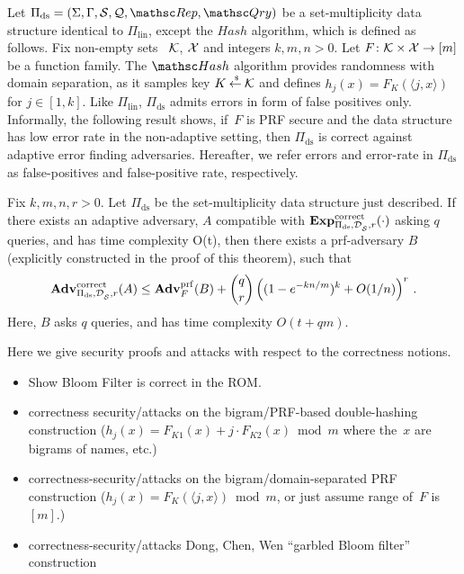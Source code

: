 Let $\Pi_{\mathrm{ds}}= (\Sigma,\Gamma,\calS,\calQ,\Rep, \Qry)$ be a set-multiplicity data structure identical to $\Pi_{\mathrm{lin}}$, except the $Hash$ algorithm, which is defined as follows. Fix non-empty sets ~${\cal K}$, ${\cal X}$ and integers $k,m,n>0$.  Let $F\colon\mathcal{K} \times {\cal X} \to [m]$ be a function family.  The $\Hash$ algorithm provides randomness with domain separation, as it samples key $K {\:\stackrel{{\scriptscriptstyle \hspace{0.2em}\$}} {\leftarrow}\:} \mathcal{K}$ and defines $h_j(x) = F_K(\langle j,x \rangle) $ for $j \in [1,k]$. Like $\Pi_{\mathrm{lin}}$, $\Pi_{\mathrm{ds}}$ admits errors in form of false positives only. Informally, the following result shows, if~$F$ is PRF secure and the data structure has low error rate in the non-adaptive setting, then $\Pi_{\mathrm{ds}}$ is correct against adaptive error finding adversaries. Hereafter, we refer errors and error-rate in $\Pi_{\mathrm{ds}}$ as false-positives and false-positive rate, respectively.

\begin{theorem}\label{thm2}
Fix $k,m,n,r >0$. Let $\Pi_{\mathrm{ds}}$ be the set-multiplicity data structure just described. If there exists an adaptive adversary, $A$ compatible with $\mathrm{\mathbf{Exp}}^{\mathrm{correct}}_{\Pi_{\mathrm{ds}},\mathcal{D}_{{\cal S}}^{},r}(\cdot)$ asking $q$ queries, and has time complexity O(t), then there exists a prf-adversary $B$ (explicitly constructed in the proof of this theorem), such that
\[
\mathrm{\mathbf{Adv}}^{\mathrm{correct}}_{\Pi_{\mathrm{ds}},\mathcal{D}_{{\cal S}}^{},r}(A) \leq  \mathbf{Adv}^{\mathrm{prf}}_{F}(B)  + {\dbinom{q}{r}} \left( (1-e^{-kn/m})^k + O(1/n) \right)^r\,.
\]
Here, $B$ asks $q$ queries, and has time complexity $O(t+qm)$.
\end{theorem}


  Here we give security proofs and attacks with respect to the correctness notions.
\begin{itemize}
\item Show Bloom Filter is correct in the ROM. 
\item correctness security/attacks on the bigram/PRF-based double-hashing construction ($h_j(x) = F_{K1}(x) + j\cdot F_{K2}(x) \bmod m$ where the~$x$ are bigrams of names, etc.)
\item correctness-security/attacks on the bigram/domain-separated PRF construction ($h_j(x)=F_K(\langle j,x \rangle) \bmod m$, or just assume range of~$F$ is $[m]$.) 
\item correctness-security/attacks Dong, Chen, Wen ``garbled Bloom filter'' construction

\end{itemize}

